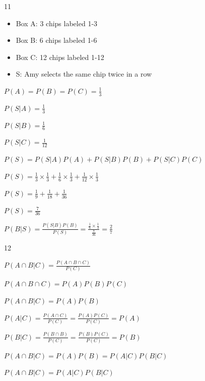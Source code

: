 \documentclass[12 pt]{article}
\begin{document}
    \begin{exercise}{11}
    \hfill

    \begin{itemize}
        \item Box A: 3 chips labeled 1-3
        \item Box B: 6 chips labeled 1-6
        \item Box C: 12 chips labeled 1-12
        \item S: Amy selects the same chip twice in a row
    \end{itemize}

    $P(A) = P(B) = P(C) = \frac{1}{3}$

    $P(S|A) = \frac{1}{3}$

    $P(S|B) = \frac{1}{6}$

    $P(S|C) = \frac{1}{12}$

    \hfill

    $P(S) = P(S|A)P(A) + P(S|B)P(B) + P(S|C)P(C)$

    $P(S) = \frac{1}{3} \times \frac{1}{3} + \frac{1}{6} \times \frac{1}{3} + \frac{1}{12} \times \frac{1}{3}$

    $P(S) = \frac{1}{9} + \frac{1}{18} + \frac{1}{36}$

    $P(S) = \frac{7}{36}$

    \hfill

    $P(B|S) = \frac{P(S|B)P(B)}{P(S)} = \frac{\frac{1}{6} \times \frac{1}{3}}{\frac{7}{36}} = \frac{2}{7}$
        
    \end{exercise}



    \begin{exercise}{12}
    \hfill

    $P(A \cap B | C) = \frac{P(A \cap B \cap C)}{P(C)}$

    \hfill

    $P(A \cap B \cap C) = P(A)P(B)P(C)$

    \hfill

    $P(A \cap B|C) = P(A)P(B)$

    \hfill

    $P(A|C) = \frac{P(A \cap C)}{P(C)} = \frac{P(A)P(C)}{P(C)} = P(A)$

    $P(B|C) = \frac{P(B \cap B)}{P(C)} = \frac{P(B)P(C)}{P(C)} = P(B)$

    \hfill

    $P(A \cap B | C) = P(A)P(B) = P(A|C)P(B|C)$

    $P(A \cap B | C) = P(A|C) P(B|C)$
    \end{exercise}
\end{document}
